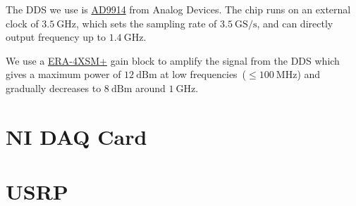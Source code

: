 The DDS we use is \href{https://www.analog.com/en/products/ad9914.html}{AD9914}
from Analog Devices.
The chip runs on an external clock of $3.5~\mathrm{GHz}$,
which sets the sampling rate of $3.5~\mathrm{GS/s}$,
and can directly output frequency up to $1.4~\mathrm{GHz}$.

We use a \href{https://www.minicircuits.com/WebStore/dashboard.html?model=ERA-4XSM\%2B}{ERA-4XSM+}
gain block to amplify the signal from the DDS which gives a maximum power of $12~\mathrm{dBm}$
at low frequencies~($\leqslant100~\mathrm{MHz}$) and gradually decreases to $8~\mathrm{dBm}$
around $1~\mathrm{GHz}$.


\section{NI DAQ Card}
\label{appendex:computer-control:nidaq}


\section{USRP}
\label{appendex:computer-control:usrp}

